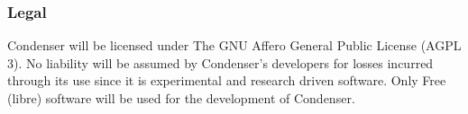 		\subsubsection{Legal}
Condenser will be licensed under The GNU Affero General Public License (AGPL 3). No liability will be assumed by Condenser's developers for losses incurred through its use since it is experimental and research driven software. Only Free (libre) software will be used for the development of Condenser.		